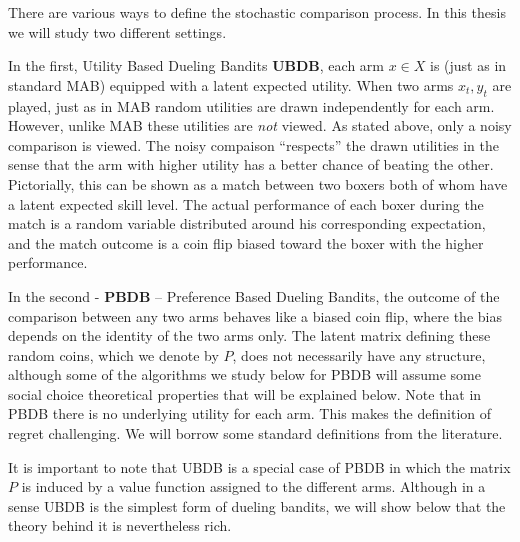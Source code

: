 \documentclass[MSc,beforeExam]{iitcsthesis}
\begin{document}
There are various ways to define the stochastic comparison process.
		In this thesis we will study two different  settings.
	
	In the first, Utility Based Dueling Bandits \textbf{UBDB}, each arm $x\in X$ is  (just as in standard MAB) equipped
with a latent expected  utility.   When two arms $x_t,y_t$ are played,  just as in MAB random utilities are drawn independently
for each arm.  However, unlike MAB these utilities are \emph{not} viewed. As stated above, only a noisy
comparison is viewed.
The noisy compaison ``respects'' the drawn utilities in the sense
that the arm with higher utility has a better chance of beating the other.  Pictorially, this can
be shown as a match between two boxers both of whom have a latent expected skill level.  The actual performance 
of each boxer during the match is a random variable distributed around his corresponding expectation, and the match
outcome is a coin flip biased toward the boxer with the higher performance.
	
	In the second - \textbf{PBDB} -- Preference Based Dueling Bandits, the outcome of the comparison between any two  arms behaves like a biased coin flip, where the bias depends on the identity of the two arms only.  The latent matrix defining these random coins, which we denote by
$P$, does not necessarily
have any structure, although some of the algorithms we study below for PBDB will assume some
social choice theoretical properties that will be explained below.   Note that in PBDB there
is no underlying utility for each arm.  This makes the definition of regret challenging.
We will borrow some standard definitions from the literature.

It is important to  note that UBDB is a special case
of PBDB in which the matrix $P$ is induced by a value function assigned to the different arms.
Although in a sense UBDB is the simplest form of dueling bandits, we will show below that the theory
behind it is nevertheless rich.

%
\end{document}
